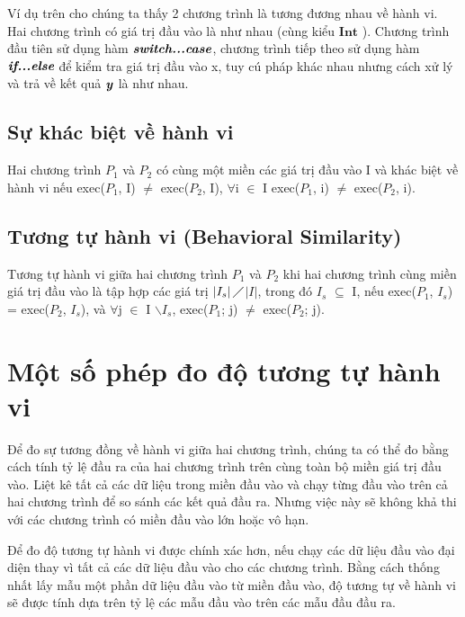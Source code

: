 




Ví dụ trên cho chúng ta thấy 2 chương trình là tương đương nhau về
hành vi. Hai chương trình có giá trị đầu vào là như nhau (cùng kiểu
$\textbf{Int}$ ). Chương trình đầu tiên sử dụng hàm
$\textit{\textbf{switch...case}}$, chương trình tiếp theo sử dụng hàm
$\textit{\textbf{if...else}}$ để kiểm tra giá trị đầu vào x, tuy cú pháp
khác nhau nhưng cách xử lý và trả về kết quả $\textbf{\textit{y}}$ là
như nhau.
	
\subsection{Sự khác biệt về hành vi }
\begin{definition}
  Hai chương trình $P_{1}$ và $P_{2}$ có cùng một miền các giá trị đầu
  vào I và khác biệt về hành vi nếu exec($P_{1}$, I) $\neq$
  exec($P_{2}$, I), $\forall$i $\in$ I exec($P_{1}$, i) $\neq$
  exec($P_{2}$, i).
\end{definition}

\subsection{Tương tự hành vi (Behavioral Similarity)}
\begin{definition}
  Tương tự hành vi giữa hai chương trình $P_{1}$ và $P_{2}$ khi hai
  chương trình cùng miền giá trị đầu vào là tập hợp các giá trị
  $\left|I_{s}\right|\diagup$$\left|I\right|$, trong đó
  $I_{s}$ $\subseteq $ I, nếu exec($P_{1}$, $I_{s}$) =
  exec($P_{2}$, $I_{s}$), và $\forall$j $\in$ I
  $\backslash$$I_{s}$, exec($P_{1}$; j) $\neq$ exec($P_{2}$; j).
\end{definition}

\section{Một số phép đo độ tương tự hành vi}
Để đo sự tương đồng về hành vi giữa hai chương trình, chúng ta có thể đo bằng cách tính tỷ lệ đầu ra của hai chương trình trên cùng toàn bộ miền giá trị đầu vào. Liệt kê tất cả các dữ liệu trong miền đầu vào và chạy từng đầu vào trên cả hai chương trình để so sánh các kết quả đầu ra. Nhưng việc này sẽ không khả thi với các chương trình có miền đầu vào lớn hoặc vô hạn.
	
Để đo độ tương tự hành vi được chính xác hơn, nếu chạy các dữ liệu đầu vào đại diện thay vì tất cả các dữ liệu đầu vào cho các chương trình. Bằng cách thống nhất lấy mẫu một phần dữ liệu đầu vào từ miền đầu vào, độ tương tự về hành vi sẽ được tính dựa trên tỷ lệ các mẫu đầu vào trên các mẫu đầu đầu ra.

